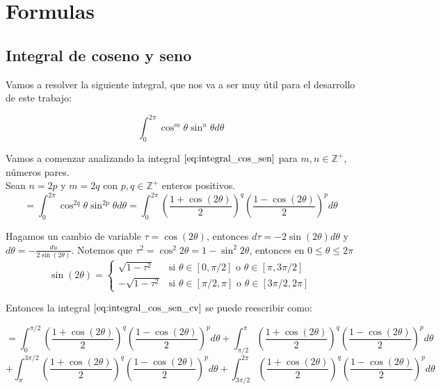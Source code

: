 \chapter{Formulas}

\section{Integral de coseno y seno}

Vamos a resolver la siguiente integral, que nos va a ser muy útil para el desarrollo de este trabajo:

\begin{equation}\label{eq:integral_cos_sen}
    \int_{0}^{2\pi}\cos^m\theta\sin^n\theta d\theta
\end{equation}

Vamos a comenzar analizando la integral $\eqref{eq:integral_cos_sen}$ para $m,n\in\mathbb{Z}^+$, números pares.\\

Sean $n=2p$ y $m=2q$ con $p,q\in\mathbb{Z}^+$ enteros positivos.\\

\begin{equation}\label{eq:integral_cos_sen_cv}
	=\int_{0}^{2\pi}\cos^{2q}\theta\sin^{2p}\theta d\theta=\int_{0}^{2\pi}\left(\frac{1+\cos(2\theta)}{2}\right)^q\left(\frac{1-\cos(2\theta)}{2}\right)^p d\theta
\end{equation}

Hagamos un cambio de variable $\tau=\cos(2\theta)$, entonces $d\tau=-2\sin(2\theta)d\theta$ y $d\theta=-\frac{du}{2\sin(2\theta)}$. Notemos que $\tau^2=\cos^2 2\theta=1-\sin^2 2\theta$, entonces en $0\leq\theta\leq2\pi$\\

\begin{equation}\label{eq:sin_cos_2theta}
    \sin(2\theta)=\left\{\begin{array}{ll}
        \sqrt{1-\tau^2} & \text{si } \theta\in[0,\pi/2] \text{ o } \theta\in[\pi,3\pi/2]\\
        -\sqrt{1-\tau^2} & \text{si } \theta\in[\pi/2,\pi] \text{ o } \theta\in[3\pi/2,2\pi]
    \end{array}\right.
\end{equation}

Entonces la integral $\eqref{eq:integral_cos_sen_cv}$ se puede reescribir como:

\[
    =\int_{0}^{\pi/2}\left(\frac{1+\cos(2\theta)}{2}\right)^q\left(\frac{1-\cos(2\theta)}{2}\right)^p d\theta + \int_{\pi/2}^{\pi}\left(\frac{1+\cos(2\theta)}{2}\right)^q\left(\frac{1-\cos(2\theta)}{2}\right)^p d\theta
\]
\[
    + \int_{\pi}^{3\pi/2}\left(\frac{1+\cos(2\theta)}{2}\right)^q\left(\frac{1-\cos(2\theta)}{2}\right)^p d\theta + \int_{3\pi/2}^{2\pi}\left(\frac{1+\cos(2\theta)}{2}\right)^q\left(\frac{1-\cos(2\theta)}{2}\right)^p d\theta
\]

